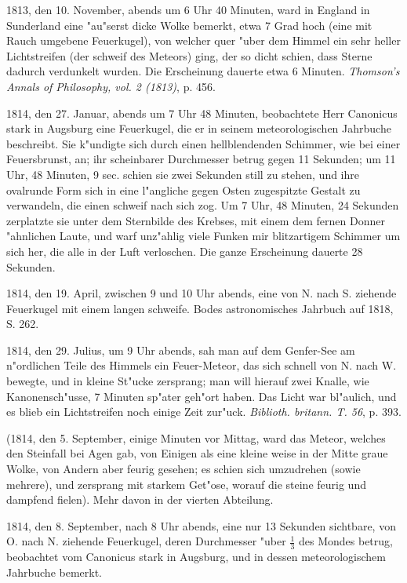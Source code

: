 \documentclass[a4paper, 11pt, oneside, polutonikogreek, german]{article}
\begin{document}
1813, den 10. November, abends um 6 Uhr 40 Minuten, ward in England in Sunderland eine "au"serst dicke Wolke bemerkt, etwa 7 Grad hoch (eine mit Rauch umgebene Feuerkugel), von welcher quer "uber dem Himmel ein sehr heller Lichtstreifen (der schweif des Meteors) ging, der so dicht schien, dass Sterne dadurch verdunkelt wurden. Die Erscheinung dauerte etwa 6 Minuten. \emph{Thomson's Annals of Philosophy, vol. 2 (1813)}, p. 456.

1814, den 27. Januar, abends um 7 Uhr 48 Minuten, beobachtete Herr Canonicus stark in Augsburg eine Feuerkugel, die er in seinem meteorologischen Jahrbuche beschreibt. Sie k"undigte sich durch einen hellblendenden Schimmer, wie bei einer Feuersbrunst, an; ihr scheinbarer Durchmesser betrug gegen 11 Sekunden; um 11 Uhr, 48 Minuten, 9 sec. schien sie zwei Sekunden still zu stehen, und ihre ovalrunde Form sich in eine l"angliche gegen Osten zugespitzte Gestalt zu verwandeln, die einen schweif nach sich zog. Um 7 Uhr, 48 Minuten, 24 Sekunden zerplatzte sie unter dem Sternbilde des Krebses, mit einem dem fernen Donner "ahnlichen Laute, und warf unz"ahlig viele Funken mir blitzartigem Schimmer um sich her, die alle in der Luft verloschen. Die ganze Erscheinung dauerte 28 Sekunden.

1814, den 19. April, zwischen 9 und 10 Uhr abends, eine von N. nach S. ziehende Feuerkugel mit einem langen schweife. Bodes astronomisches Jahrbuch auf 1818, S. 262.

1814, den 29. Julius, um 9 Uhr abends, sah man auf dem Genfer-See am n"ordlichen Teile des Himmels ein Feuer-Meteor, das sich schnell von N. nach W. bewegte, und in kleine St"ucke zersprang; man will hierauf zwei Knalle, wie Kanonensch"usse, 7 Minuten sp"ater geh"ort haben. Das Licht war bl"aulich, und es blieb ein Lichtstreifen noch einige Zeit zur"uck. \emph{Biblioth. britann. T. 56}, p. 393.

(1814, den 5. September, einige Minuten vor Mittag, ward das Meteor, welches den Steinfall bei Agen gab, von Einigen als eine kleine weise in der Mitte graue Wolke, von Andern aber feurig gesehen; es schien sich umzudrehen (sowie mehrere), und zersprang mit starkem Get"ose, worauf die steine feurig und dampfend fielen). Mehr davon in der vierten Abteilung.

1814, den 8. September, nach 8 Uhr abends, eine nur 13 Sekunden sichtbare, von O. nach N. ziehende Feuerkugel, deren Durchmesser "uber $\mathfrak{\frac{1}{3}}$ des Mondes betrug, beobachtet vom Canonicus stark in Augsburg, und in dessen meteorologischem Jahrbuche bemerkt.
\end{document}
